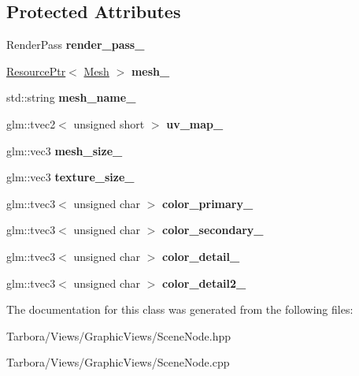 \subsection*{Protected Attributes}
\begin{DoxyCompactItemize}
\item 
\mbox{\label{classTarbora_1_1MeshNode_afcfdf1bd6a3d3656c478cdee62f15d72}} 
Render\+Pass {\bfseries render\+\_\+pass\+\_\+}
\item 
\mbox{\label{classTarbora_1_1MeshNode_a2fff0c6db39a4d27bc484c66b00fd7cc}} 
\hyperlink{classTarbora_1_1ResourcePtr}{Resource\+Ptr}$<$ \hyperlink{classTarbora_1_1Mesh}{Mesh} $>$ {\bfseries mesh\+\_\+}
\item 
\mbox{\label{classTarbora_1_1MeshNode_a4a84136c112f9f9f6efc9464167d9eeb}} 
std\+::string {\bfseries mesh\+\_\+name\+\_\+}
\item 
\mbox{\label{classTarbora_1_1MeshNode_afdf5555abddd25e249a748b889198eac}} 
glm\+::tvec2$<$ unsigned short $>$ {\bfseries uv\+\_\+map\+\_\+}
\item 
\mbox{\label{classTarbora_1_1MeshNode_a79f457fdd6161807b81916c09d90bcfa}} 
glm\+::vec3 {\bfseries mesh\+\_\+size\+\_\+}
\item 
\mbox{\label{classTarbora_1_1MeshNode_a29c654c0d45ae53425fcc074d8862d52}} 
glm\+::vec3 {\bfseries texture\+\_\+size\+\_\+}
\item 
\mbox{\label{classTarbora_1_1MeshNode_a94ec7dc843765def28e339278b6f30b6}} 
glm\+::tvec3$<$ unsigned char $>$ {\bfseries color\+\_\+primary\+\_\+}
\item 
\mbox{\label{classTarbora_1_1MeshNode_a05b0ee41684eec48db8751b323a635fa}} 
glm\+::tvec3$<$ unsigned char $>$ {\bfseries color\+\_\+secondary\+\_\+}
\item 
\mbox{\label{classTarbora_1_1MeshNode_a98922801d806120194d59366e0e54a78}} 
glm\+::tvec3$<$ unsigned char $>$ {\bfseries color\+\_\+detail\+\_\+}
\item 
\mbox{\label{classTarbora_1_1MeshNode_a9c8fde9bafb87ee78df7e5ac3d2ceec2}} 
glm\+::tvec3$<$ unsigned char $>$ {\bfseries color\+\_\+detail2\+\_\+}
\end{DoxyCompactItemize}


The documentation for this class was generated from the following files\+:\begin{DoxyCompactItemize}
\item 
Tarbora/\+Views/\+Graphic\+Views/Scene\+Node.\+hpp\item 
Tarbora/\+Views/\+Graphic\+Views/Scene\+Node.\+cpp\end{DoxyCompactItemize}
